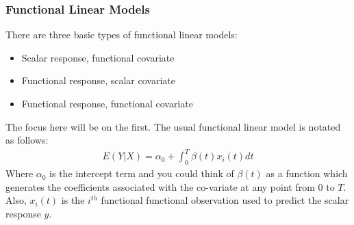 \documentclass{article}
\newlength{\tmpShadow}
\newcommand{\ourShadow}[2]{%
    \settowidth{\tmpShadow}{#1}
    \addtolength{\tmpShadow}{.1em}
    \raisebox{-0.25ex}{\textcolor{gray!70}{#1}}%
    \kern-\tmpShadow%
    \textcolor{#2}{#1}%
}
\begin{document}
\subsubsection{Functional Linear Models}

\noindent There are three basic types of functional linear models:
\begin{itemize}[label={\ourShadow{$\star$}{black}}] 
    \item Scalar response, functional covariate
    \item Functional response, scalar covariate
    \item Functional response, functional covariate
\end{itemize}
\noindent The focus here will be on the first. The usual functional linear model is notated as follows:
\begin{align}
    E(Y|X) = \alpha_0 + \int_{0}^{T} \beta(t)x_i(t)dt
\end{align}
\noindent Where $\alpha_0$ is the intercept term and you could think of $\beta(t)$ as a function which generates the coefficients associated with the co-variate at any point from 0 to $T$. Also, $x_{i}(t)$ is the $i^{th}$ functional functional observation used to predict the scalar response $y$.
\end{document}
